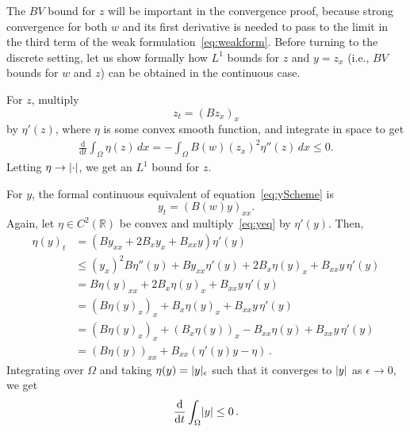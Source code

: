 \documentclass[11pt,leqno]{amsart}
\newcommand{\R}{\mathbb{R}}
\newcommand{\ddt}[1]{\frac{\mathrm{d}#1}{\mathrm{d}t}}
\newcommand{\pt}[1]{#1_t}
\newcommand{\px}[1]{#1_x }
\newcommand{\pxx}[1]{#1_{xx}}
\DeclarePairedDelimiter\abs{\lvert}{\rvert}
\begin{document}
The $BV$ bound for $z$ will be important in the convergence proof, because strong convergence for both $w$ and its first derivative is needed to pass to the limit in the third term of the weak formulation~\eqref{eq:weakform}. Before turning to the discrete setting, 
let us show formally how $L^1$ bounds for $z$ and $y=\px{z}$ (i.e., $BV$ bounds for $w$ and $z$) can be obtained in the continuous case.

For $z$, multiply
\begin{equation*}
  \pt{z}=\px{(B \px{z})}
\end{equation*}
by $\eta'(z)$, where $\eta$ is some convex smooth function, and integrate in space to get
\begin{align*}
  \ddt{} \int_\Omega \eta(z)\,dx = - \int_\Omega B(w) (\px{z})^2 \eta''(z)\,dx \le 0. 
\end{align*}
Letting $\eta\rightarrow \abs{\cdot}$, we get an $L^1$ bound for $z$.

For $y$, the formal continuous equivalent of equation~\eqref{eq:yScheme} is
\begin{equation}\label{eq:yeq}
  \pt{y}=\pxx{(B(w)y)}.
\end{equation}
Again, let $\eta\in C^2(\R)$ be convex and multiply~\eqref{eq:yeq} by $\eta'(y)$. Then, 
\begin{align*}
  \pt{\eta(y)}&=(B \pxx{y}+ 2 \px{B} \px{y} + \pxx{B} y) \eta'(y)\\
&\leq   (\px{y})^2 B\eta''(y)+B \pxx{y} \eta'(y) + 2 \px{B} \px{\eta(y)} + \pxx{B} y\, \eta'(y)\\
&= B \pxx{\eta(y)} +  2 \px{B} \px{\eta(y)} + \pxx{B} y\, \eta'(y)\\
&= \px{(B \px{\eta(y)})} + \px{B}\px{\eta(y)} + \pxx{B} y\, \eta'(y)\\
&=\px{(B \px{\eta(y)})} + \px{(\px{B}\eta(y))} - \pxx{B}\eta(y) + \pxx{B} y\, \eta'(y)\\
&= \pxx{(B \eta(y))} + \pxx{B} (\eta'(y) y -\eta)\,. 
\end{align*}
Integrating over $\Omega$ and taking $\eta(y)=\abs{y}_\epsilon$ such that it converges to $\abs{y}$ as $\epsilon\rightarrow 0$, we get 
\begin{align*}
  \ddt{} \int_\Omega \abs{y}\le 0\,.
\end{align*}  
\end{document}
